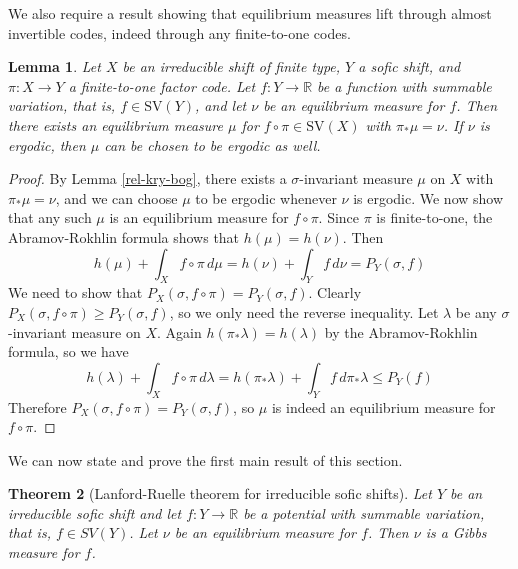 \documentclass{amsproc}
\newtheorem{theorem}{Theorem}
\numberwithin{theorem}{section}
\newtheorem{lemma}[theorem]{Lemma}
\theoremstyle{remark}
\theoremstyle{definition}
\newcommand{\R}{\mathbb{R}}
\newcommand{\SV}{\mathrm{SV}}
\theoremstyle{plain}
\begin{document}
We also require a result showing that equilibrium measures lift through almost invertible codes, indeed through any finite-to-one codes.
%
\begin{lemma}\label{lift-eqm}
Let $X$ be an irreducible shift of finite type, $Y$ a sofic shift, and $\pi: X \to Y$ a finite-to-one factor code. Let $f\colon Y \to \R$ be a function with summable variation, that is, $f \in \SV(Y)$, and let $\nu$ be an equilibrium measure for $f$. Then there exists an equilibrium measure $\mu$ for $f \circ \pi \in \SV(X)$ with $\pi_* \mu = \nu$. If $\nu$ is ergodic, then $\mu$ can be chosen to be ergodic as well.
\end{lemma}
%
\begin{proof}
By Lemma \ref{rel-kry-bog}, there exists a $\sigma$-invariant measure $\mu$ on $X$ with $\pi_* \mu = \nu$, and we can choose $\mu$ to be ergodic whenever $\nu$ is ergodic. We now show that any such $\mu$ is an equilibrium measure for $f \circ \pi$. Since $\pi$ is finite-to-one, the Abramov-Rokhlin formula \cite{adler1963skew} shows that $h(\mu) = h(\nu)$. Then
\[
    h(\mu) + \int_X f \circ \pi \, d\mu = h(\nu) + \int_Y f \, d\nu = P_Y(\sigma, f)
\]
We need to show that $P_X(\sigma, f \circ \pi) = P_Y(\sigma, f)$. Clearly $P_X(\sigma, f \circ \pi) \geq P_Y(\sigma, f)$, so we only need the reverse inequality. Let $\lambda$ be any $\sigma$-invariant measure on $X$. Again $h(\pi_* \lambda) = h(\lambda)$ by the Abramov-Rokhlin formula, so we have
%
\[
    h(\lambda) + \int_X f \circ \pi \, d\lambda = h(\pi_* \lambda) + \int_Y f \, d\pi_* \lambda \leq P_Y(f)
\]
Therefore $P_X(\sigma, f \circ \pi) = P_Y(\sigma, f)$, so $\mu$ is indeed an equilibrium measure for $f \circ \pi$.
\end{proof}





We can now state and prove the first main result of this section.




\begin{theorem}[Lanford-Ruelle theorem for irreducible sofic shifts]\label{sofic-lf}
Let $Y$ be an irreducible sofic shift and let $f\colon Y \to \R$ be a potential with summable variation, that is, $f \in SV(Y)$. Let $\nu$ be an equilibrium measure for $f$. Then $\nu$ is a Gibbs measure for $f$. 
\end{theorem}
\end{document}
